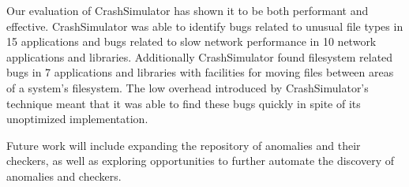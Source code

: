 Our evaluation of CrashSimulator has shown it to be both performant and
effective.  CrashSimulator was able to identify bugs related to unusual file
types in 15 applications and bugs related to slow network performance in 10
network applications and libraries.  Additionally CrashSimulator found
filesystem related bugs in 7 applications and libraries with facilities for
moving files between areas of a system's filesystem.  The low overhead
introduced by CrashSimulator's technique meant that it was able to
find these bugs quickly in spite of its unoptimized implementation.

Future work will include expanding the repository of anomalies and their checkers, as well as exploring opportunities to further automate the discovery of anomalies and checkers.
